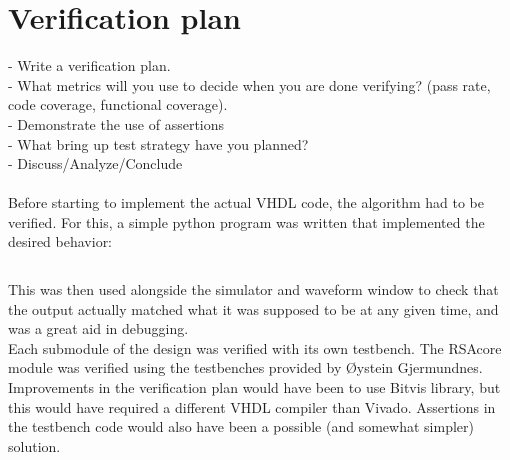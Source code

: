 \section{Verification plan}
- Write a verification plan.\\
- What metrics will you use to decide when you are done verifying?
(pass rate, code coverage, functional coverage).\\
- Demonstrate the use of assertions \\
- What bring up test strategy have you planned?\\ 
- Discuss/Analyze/Conclude\\
\\
Before starting to implement the actual VHDL code, the algorithm had to be verified. For this, a simple python program was written that implemented the desired behavior:

\inputminted[firstline=45,lastline=56]{python}{../Project/monexp.py}

This was then used alongside the simulator and waveform window to check that the output actually matched what it was supposed to be at any given time, and was a great aid in debugging.\\

Each submodule of the design was verified with its own testbench. %
The RSAcore module was verified using the testbenches provided by Øystein Gjermundnes.
\\
Improvements in the verification plan would have been to use Bitvis library, but this would have required a different VHDL compiler than Vivado. Assertions in the testbench code would also have been a possible (and somewhat simpler) solution.